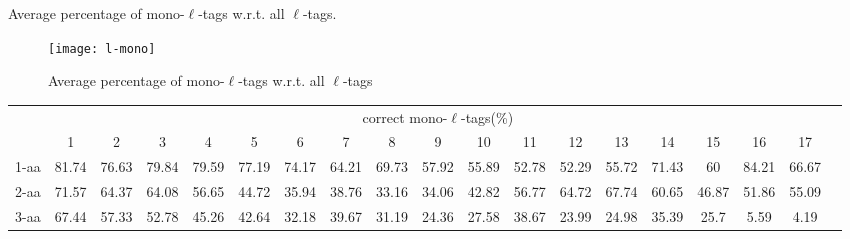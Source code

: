 \documentclass{article}[12pt]
\begin{document}
\begin{landscape}
\begin{table}[h]
\caption{ Average percentage of mono-$\ell$-tags w.r.t. all $\ell$-tags.}
\label{table:l-mono}

\vspace{3mm}
\end{table}
\end{landscape}

\begin{figure}
  \begin{center}
\texttt{[image: l-mono]}
\end{center}
\caption{Average percentage of mono-$\ell$-tags w.r.t. all $\ell$-tags}
  \label{fig:l-mono}
\end{figure}


\begin{landscape}

\begin{table}[h]\tiny
\vspace{3mm}
{\centering
\begin{center}
\begin{tabular}{|l|c|c|c|c|c|c|c|c|c|c|c|c|c|c|c|c|c|c|}
  \hline
  & \multicolumn{ 17 }{|c|}{correct mono-$\ell$-tags(\%)} \\
  \cline{2- 18}
    & 1 & 2 & 3 & 4 & 5 & 6 & 7 & 8 & 9 & 10 & 11 & 12 & 13 & 14 & 15 & 16 & 17\\
  \hline
1-aa  & 81.74 & 76.63 & 79.84 & 79.59 & 77.19 & 74.17 & 64.21 & 69.73 & 57.92 & 55.89 & 52.78 & 52.29 & 55.72 & 71.43 & 60 & 84.21 & 66.67\\
2-aa  & 71.57 & 64.37 & 64.08 & 56.65 & 44.72 & 35.94 & 38.76 & 33.16 & 34.06 & 42.82 & 56.77 & 64.72 & 67.74 & 60.65 & 46.87 & 51.86 & 55.09\\
3-aa  & 67.44 & 57.33 & 52.78 & 45.26 & 42.64 & 32.18 & 39.67 & 31.19 & 24.36 & 27.58 & 38.67 & 23.99 & 24.98 & 35.39 & 25.7 & 5.59 & 4.19\\
 \hline
\end{tabular}
\end{center}
\par}
\centering


\end{table}
\end{landscape}
\end{document}
